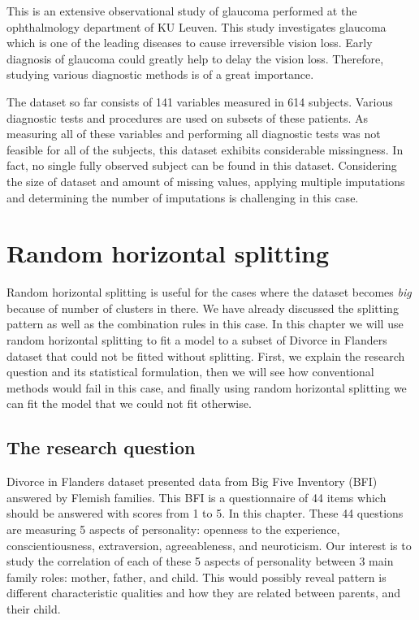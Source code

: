 \documentclass[11pt,a5paper,twoside]{book}
\begin{document}
This is an extensive observational study of glaucoma performed at the ophthalmology department of KU Leuven. This study investigates glaucoma which is one of the leading diseases to cause irreversible vision loss. Early diagnosis of glaucoma could greatly help to delay the vision loss. Therefore, studying various diagnostic methods is of a great importance. 

The dataset so far consists of 141 variables measured in 614 subjects. Various diagnostic tests and procedures are used on subsets of these patients. As measuring all of these variables and performing all diagnostic tests was not feasible for all of the subjects, this dataset exhibits considerable missingness. In fact, no single fully observed subject can be found in this dataset. Considering the size of dataset and amount of missing values, applying multiple imputations and determining the number of imputations is challenging in this case. 




\chapter{Random horizontal splitting}

Random horizontal splitting is useful for the cases where the dataset becomes \emph{big} because of number of clusters in there. We have already discussed the splitting pattern as well as the combination rules in this case. In this chapter we will use random horizontal splitting to fit a model to a subset of Divorce in Flanders dataset that could not be fitted without splitting. First, we explain the research question and its statistical formulation, then we will see how conventional methods would fail in this case, and finally using random horizontal splitting we can fit the model that we could not fit otherwise.

\section{The research question}

Divorce in Flanders dataset presented data from Big Five Inventory (BFI) answered by Flemish families. This BFI is a questionnaire of 44 items which should be answered with scores from 1 to 5. In this chapter. These 44 questions are measuring 5 aspects of personality: openness to the experience, conscientiousness, extraversion, agreeableness, and neuroticism.  Our interest is to study the correlation of each of these 5 aspects of personality between 3 main family roles: mother, father, and child. This would possibly reveal pattern is different characteristic qualities and how they are related between parents, and their child.
\end{document}
